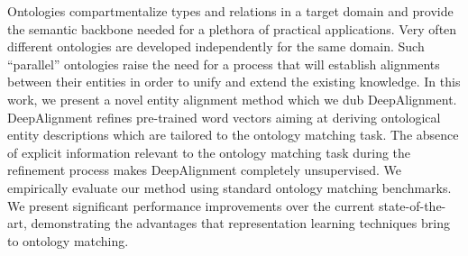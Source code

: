 Ontologies compartmentalize types and relations in a target domain and provide the semantic backbone needed for a plethora of practical applications. Very often different ontologies are developed independently for the same domain. Such ``parallel'' ontologies raise the need for a process that will establish alignments between their entities in order to unify and extend the existing knowledge. In this work, we present a novel entity alignment method which we dub DeepAlignment. DeepAlignment refines pre-trained word vectors aiming at deriving ontological entity descriptions which are tailored to the ontology matching task. The absence of explicit information relevant to the ontology matching task during the refinement process makes DeepAlignment completely unsupervised. We empirically evaluate our method using standard ontology matching benchmarks. We present significant performance improvements over the current state-of-the-art, demonstrating the advantages that representation learning techniques bring to ontology matching.
